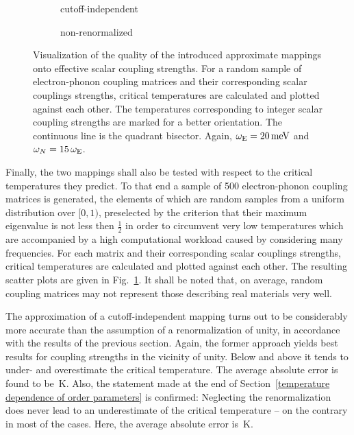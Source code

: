 \begin{figure}
    \small
    \begin{subfigure}{7cm}
        
        \caption{cutoff-independent}
    \end{subfigure}%
    \begin{subfigure}{7cm}
        
        \caption{non-renormalized}
    \end{subfigure}%
    \caption[Effective scalar coupling strengths]{
        Visualization of the quality of the introduced approximate mappings onto
        effective scalar coupling strengths. For a random sample of
        electron-phonon coupling matrices and their corresponding scalar
        couplings strengths, critical temperatures are calculated and plotted
        against each other. The temperatures corresponding to integer scalar
        coupling strengths are marked for a better orientation. The continuous
        line is the quadrant bisector. Again, $\omega \sb{\text{E}} = 20 \, \mathrm{meV}$
        and $\omega_N = 15 \, \omega \sb{\text{E}}$.}
    \label{quality of the effective scalar coupling strengths}
\end{figure}
%
Finally, the two mappings shall also be tested with respect to the critical
temperatures they predict. To that end a sample of 500 electron-phonon coupling
matrices is generated, the elements of which are random samples from a uniform
distribution over $[0, 1)$, preselected by the criterion that their maximum
eigenvalue is not less then $\frac 1 2$ in order to circumvent very low
temperatures which are accompanied by a high computational workload caused by
considering many  frequencies. For each matrix and their
corresponding scalar couplings strengths, critical temperatures are calculated
and plotted against each other. The resulting scatter plots are given in
Fig.~\ref{quality of the effective scalar coupling strengths}. It shall be noted
that, on average, random coupling matrices may not represent those describing
real materials very well.

The approximation of a cutoff-independent mapping turns out to be considerably
more accurate than the assumption of a renormalization of unity, in accordance
with the results of the previous section. Again, the former approach yields best
results for coupling strengths in the vicinity of unity. Below and above it
tends to under- and overestimate the critical temperature. The average absolute
error is found to be \,K. Also, the statement made
at the end of Section~\ref{temperature dependence of order parameters} is
confirmed: Neglecting the renormalization does never lead to an underestimate of
the critical temperature -- on the contrary in most of the cases. Here, the
average absolute error is \,K.
